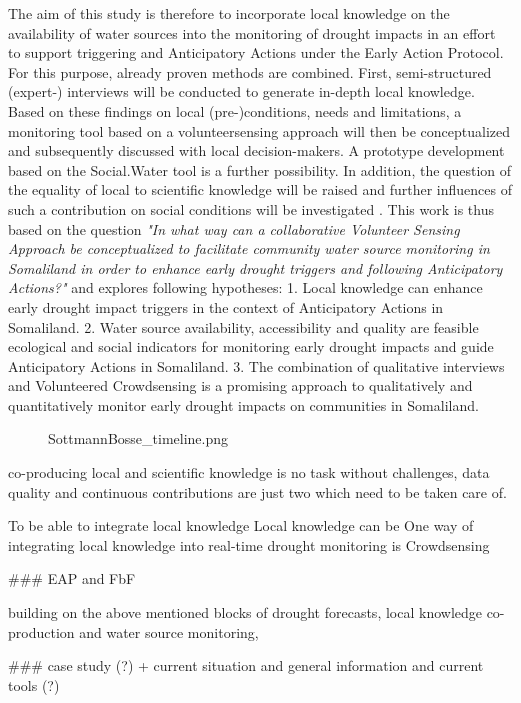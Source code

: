 The aim of this study is therefore to incorporate local knowledge on the availability of water sources into the monitoring of drought impacts in an effort to support triggering and Anticipatory Actions under the Early Action Protocol. For this purpose, already proven methods are combined. First, semi-structured (expert-) interviews will be conducted to generate in-depth local knowledge. Based on these findings on local (pre-)conditions, needs and limitations, a monitoring tool based on a volunteersensing approach will then be conceptualized and subsequently discussed with local decision-makers. A prototype development based on the Social.Water tool is a further possibility. In addition, the question of the equality of local to scientific knowledge will be raised and further influences of such a contribution on social conditions will be investigated .
This work is thus based on the question \textit{"In what way can a collaborative Volunteer Sensing Approach be conceptualized to facilitate community water source monitoring in Somaliland in order to enhance early drought triggers and following Anticipatory Actions?"} and explores following hypotheses:
1. Local knowledge can enhance early drought impact triggers in the context of Anticipatory Actions in Somaliland.
2. Water source availability, accessibility and quality are feasible ecological and social indicators for monitoring early drought impacts and guide Anticipatory Actions in Somaliland.
3. The combination of qualitative interviews and Volunteered Crowdsensing is a promising approach to qualitatively and quantitatively monitor early drought impacts on communities in Somaliland.

\begin{figure}
    SottmannBosse_timeline.png
\end{figure}



co-producing local and scientific knowledge is no task without challenges, data quality and continuous contributions are just two which need to be taken care of. 

To be able to integrate local knowledge
Local knowledge can be 
One way of integrating local knowledge into real-time drought monitoring is Crowdsensing


\#\#\# EAP and FbF

building on the above mentioned blocks of drought forecasts, local knowledge co-production and water source monitoring, 

\#\#\# case study (?) + current situation and general information and current tools (?)

